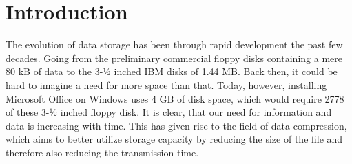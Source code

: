\documentclass{article}
\begin{document}
\newpage

\tableofcontents

\newpage
{}
\section{Introduction}


The evolution of data storage has been through rapid development the past few decades. Going from the preliminary commercial floppy disks containing a mere 80 kB of data to the 3-½ inched IBM disks of 1.44 MB. Back then, it could be hard to imagine a need for more space than that. Today, however, installing Microsoft Office on Windows uses 4 GB of disk space, which would require 2778 of these 3-½ inched floppy disk. It is clear, that our need for information and data is increasing with time.
This has given rise to the field of data compression, which aims to better utilize storage capacity by reducing the size of the file and therefore also reducing the transmission time.
\end{document}
